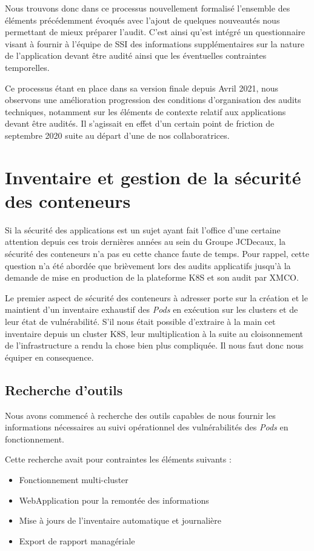 Nous trouvons donc dans ce processus nouvellement formalisé l'ensemble des éléments précédemment évoqués avec l'ajout 
de quelques nouveautés nous permettant de mieux préparer l'audit. C'est ainsi qu'est intégré un questionnaire visant à
fournir à l'équipe de \ac{SSI} des informations supplémentaires sur la nature de l'application devant être audité ainsi 
que les éventuelles contraintes temporelles.

Ce processus étant en place dans sa version finale depuis Avril 2021, nous observons une amélioration progression des 
conditions d'organisation des audits techniques, notamment sur les éléments de contexte relatif aux applications devant 
être audités.
Il s'agissait en effet d'un certain point de friction de septembre 2020 suite au départ d'une de nos collaboratrices.

\newpage

\section{Inventaire et gestion de la sécurité des conteneurs}
Si la sécurité des applications est un sujet ayant fait l'office d'une certaine attention depuis ces trois dernières années
au sein du Groupe JCDecaux, la sécurité des conteneurs n'a pas eu cette chance faute de temps.
\newline Pour rappel, cette question n'a été abordée que brièvement lors des audits applicatifs jusqu'à la demande de 
mise en production de la plateforme \ac{K8S} et son audit par XMCO.

Le premier aspect de sécurité des conteneurs à adresser porte sur la création et le maintient d'un inventaire exhaustif
des \emph{Pods} en exécution sur les clusters et de leur état de vulnérabilité. S'il nous était possible d'extraire à la
main cet inventaire depuis un cluster \ac{K8S}, leur multiplication à la suite au cloisonnement de 
l'infrastructure a rendu la chose bien plus compliquée. Il nous faut donc nous équiper en consequence.

\subsection{Recherche d'outils}
Nous avons commencé à recherche des outils capables de nous fournir les informations nécessaires au suivi opérationnel 
des vulnérabilités des \emph{Pods} en fonctionnement. 

Cette recherche avait pour contraintes les éléments suivants :
\begin{itemize}
    \item Fonctionnement multi-cluster
    \item WebApplication pour la remontée des informations
    \item Mise à jours de l'inventaire automatique et journalière
    \item Export de rapport managériale
\end{itemize}

